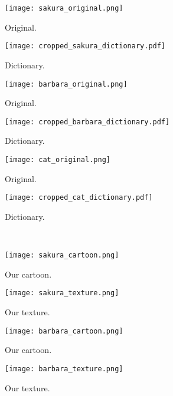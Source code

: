\documentclass[10pt,twocolumn,letterpaper]{article}
\begin{document}
\begin{figure*}[b!]
	\centering
	\begin{subfigure}{0.12\textwidth}
		\centering
		\texttt{[image: sakura\_original.png]}
		\caption{Original.}
	\end{subfigure}
	\begin{subfigure}{0.12\textwidth}
		\centering
		\texttt{[image: cropped\_sakura\_dictionary.pdf]}
		\caption{Dictionary.}
	\end{subfigure}
	\hspace{0.5cm}
	\begin{subfigure}{0.12\textwidth}
		\centering
		\texttt{[image: barbara\_original.png]}
		\caption{Original.}
	\end{subfigure}
	\begin{subfigure}{0.12\textwidth}
		\centering
		\texttt{[image: cropped\_barbara\_dictionary.pdf]}
		\caption{Dictionary.}
	\end{subfigure}
	\hspace{0.5cm}
	\begin{subfigure}{0.12\textwidth}
		\centering
		\texttt{[image: cat\_original.png]}
		\caption{Original.}
	\end{subfigure}
	\begin{subfigure}{0.12\textwidth}
		\centering
		\texttt{[image: cropped\_cat\_dictionary.pdf]}
		\caption{Dictionary.}
	\end{subfigure}
	\\[0.1cm]
	\begin{subfigure}{0.12\textwidth}
		\centering
		\texttt{[image: sakura\_cartoon.png]}
		\caption{Our cartoon.}
	\end{subfigure}
	\begin{subfigure}{0.12\textwidth}
		\centering
		\texttt{[image: sakura\_texture.png]}
		\caption{Our texture.}
	\end{subfigure}
	\hspace{0.5cm}
	\begin{subfigure}{0.12\textwidth}
		\centering
		\texttt{[image: barbara\_cartoon.png]}
		\caption{Our cartoon.}
	\end{subfigure}
	\begin{subfigure}{0.12\textwidth}
		\centering
		\texttt{[image: barbara\_texture.png]}
		\caption{Our texture.}
	\end{subfigure}
	\hspace{0.5cm}

\end{figure*}
\end{document}

